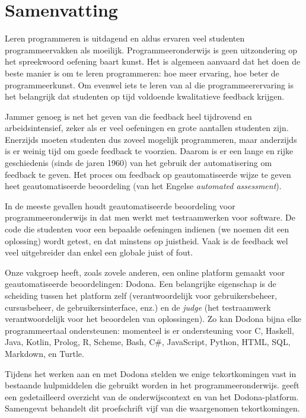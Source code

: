 \documentclass[main]{subfiles}
\begin{document}

\chapter{Samenvatting}\label{ch:samenvatting}

Leren programmeren is uitdagend en aldus ervaren veel studenten programmeervakken als moeilijk.
Programmeeronderwijs is geen uitzondering op het spreekwoord oefening baart kunst.
Het is algemeen aanvaard dat het doen de beste manier is om te leren programmeren: hoe meer ervaring, hoe beter de programmeerkunst.
Om evenwel iets te leren van al die programmeerervaring is het belangrijk dat studenten op tijd voldoende kwalitatieve feedback krijgen.

Jammer genoeg is net het geven van die feedback heel tijdrovend en arbeidsintensief, zeker als er veel oefeningen en grote aantallen studenten zijn.
Enerzijds moeten studenten dus zoveel mogelijk programmeren, maar anderzijds is er weinig tijd om goede feedback te voorzien.
Daarom is er een lange en rijke geschiedenis (sinds de jaren 1960) van het gebruik der automatisering om feedback te geven.
Het proces om feedback op geautomatiseerde wijze te geven heet geautomatiseerde beoordeling (van het Engelse \textit{\textenglish{automated assessment}}).

In de meeste gevallen houdt geautomatiseerde beoordeling voor programmeeronderwijs in dat men werkt met testraamwerken voor software.
De code die studenten voor een bepaalde oefeningen indienen (we noemen dit een oplossing) wordt getest, en dat minstens op juistheid.
Vaak is de feedback wel veel uitgebreider dan enkel een globale juist of fout.

Onze vakgroep heeft, zoals zovele anderen, een online platform gemaakt voor geautomatiseerde beoordelingen: Dodona.
Een belangrijke eigenschap is de scheiding tussen het platform zelf (verantwoordelijk voor gebruikersbeheer, cursusbeheer, de gebruikersinterface, enz.) en de \textit{judge} (het testraamwerk verantwoordelijk voor het beoordelen van oplossingen).
Zo kan Dodona bijna elke programmeertaal ondersteunen: momenteel is er ondersteuning voor C, Haskell, Java, Kotlin, Prolog, R, Scheme, Bash, C\#, JavaScript, Python, HTML, SQL, Markdown, en Turtle.

Tijdens het werken aan en met Dodona stelden we enige tekortkomingen vast in bestaande hulpmiddelen die gebruikt worden in het programmeeronderwijs.
 geeft een gedetailleerd overzicht van de onderwijscontext en van het Dodona-platform.
Samengevat behandelt dit proefschrift vijf van die waargenomen tekortkomingen.
\end{document}
